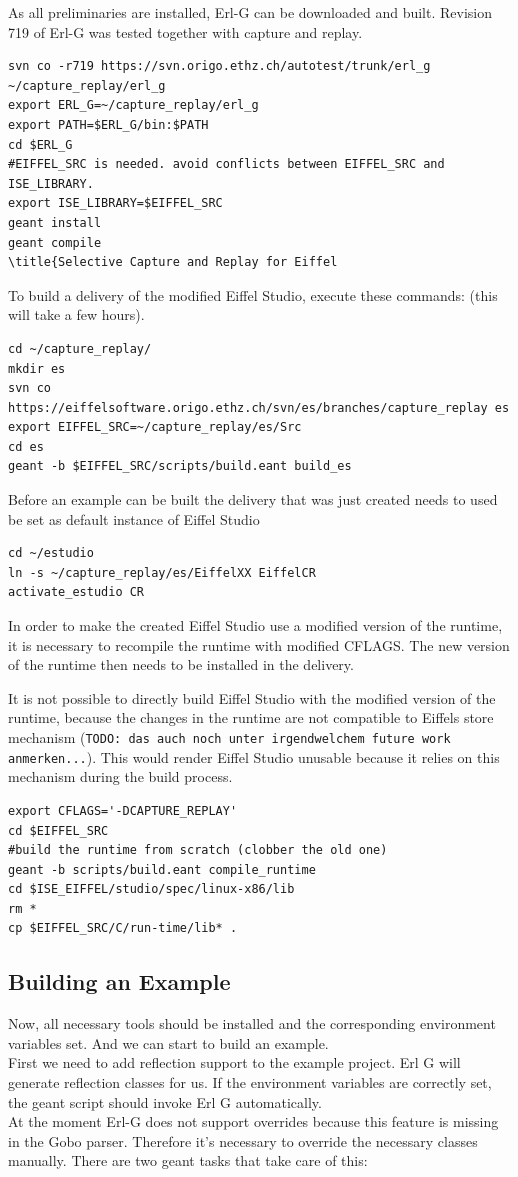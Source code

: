 As all preliminaries are installed, Erl-G \cite{erlg} can be downloaded and built. Revision 719 of Erl-G was tested together with capture and replay.
\begin{lstlisting}
svn co -r719 https://svn.origo.ethz.ch/autotest/trunk/erl_g ~/capture_replay/erl_g
export ERL_G=~/capture_replay/erl_g
export PATH=$ERL_G/bin:$PATH
cd $ERL_G
#EIFFEL_SRC is needed. avoid conflicts between EIFFEL_SRC and ISE_LIBRARY.
export ISE_LIBRARY=$EIFFEL_SRC
geant install
geant compile
\title{Selective Capture and Replay for Eiffel
\end{lstlisting}

To build a delivery of the modified Eiffel Studio, execute these commands: (this will take a few hours).
\begin{lstlisting}
cd ~/capture_replay/
mkdir es
svn co https://eiffelsoftware.origo.ethz.ch/svn/es/branches/capture_replay es
export EIFFEL_SRC=~/capture_replay/es/Src
cd es
geant -b $EIFFEL_SRC/scripts/build.eant build_es
\end{lstlisting}

Before an example can be built the delivery that was just created needs to used be set as default instance of Eiffel Studio
\begin{lstlisting}
cd ~/estudio
ln -s ~/capture_replay/es/EiffelXX EiffelCR
activate_estudio CR
\end{lstlisting}

In order to make the created Eiffel Studio use a modified version of the runtime, it is necessary to recompile the runtime with modified CFLAGS. The new version of the runtime then needs to be installed in the delivery.

It is not possible to directly build Eiffel Studio with the modified version of the runtime, because the changes in the runtime are not compatible to Eiffels store mechanism (\texttt{TODO: das auch noch unter irgendwelchem future work anmerken...}). This would render Eiffel Studio unusable because it relies on this mechanism during the build process.
\begin{lstlisting}
export CFLAGS='-DCAPTURE_REPLAY' 
cd $EIFFEL_SRC
#build the runtime from scratch (clobber the old one)
geant -b scripts/build.eant compile_runtime
cd $ISE_EIFFEL/studio/spec/linux-x86/lib
rm *
cp $EIFFEL_SRC/C/run-time/lib* .
\end{lstlisting}


\subsection{Building an Example}
Now, all necessary tools should be installed and the corresponding environment variables set. And we can start to build an example.\\
First we need to add reflection support to the example project. Erl G will generate reflection classes for us. If the environment variables are correctly set, the geant script should invoke Erl G automatically. \\
At the moment Erl-G does not support overrides because this feature is missing in the Gobo parser. Therefore it's necessary to override the necessary classes manually. There are two geant tasks that take care of this:

